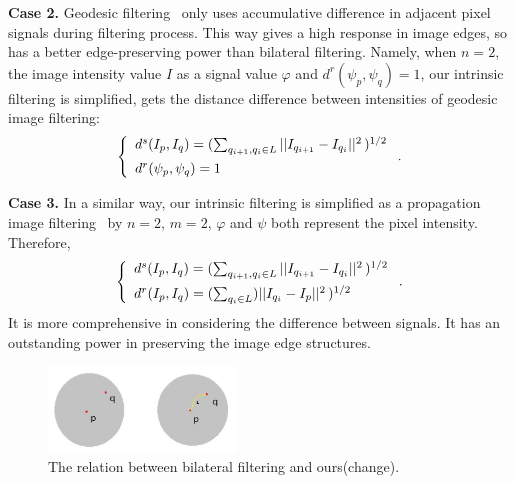 {\bfseries Case 2.}
Geodesic filtering~\cite{grazzini2009edge} only uses accumulative difference in adjacent pixel signals during filtering process.
This way gives a high response in image edges, so has a better edge-preserving power than bilateral filtering.
Namely, when $n=2$, the image intensity value $I$ as a signal value $\varphi$ and $d^{r}(\psi_p, \psi_q) = 1$,
our intrinsic filtering is simplified, gets the distance difference between intensities of geodesic image filtering:
 \begin{equation}
 \label{Eq:GeodesicDistance}
 \left \{
 \begin{array}{ll}
        d^{s}(I_p,I_q) = (\sum_{q_{i+1}, q_i \in{L}}||I_{q_{i+1}} - I_{q_i}||^{2}\,)^{1/2} \vspace{1.5mm} \\
        d^{r}(\psi_p, \psi_q) = 1 \\
 \end{array}
 \right. .
 \end{equation}

{\bfseries Case 3.}
In a similar way, our intrinsic filtering is simplified as a propagation image filtering~\cite{Chang2015propagated} by $n=2$, $m=2$, $\varphi$ and $\psi$ both represent the pixel intensity.
Therefore,
 \begin{equation}
 \label{Eq:PropagationDistance}
 \left \{
 \begin{array}{ll}
        d^{s}(I_p, I_q) = (\sum_{q_{i+1}, q_i \in{L}}||I_{q_{i+1}} - I_{q_i}||^{2}\,)^{1/2} \vspace{1.5mm}\\
        d^{r}(I_p, I_q) = (\sum_{{q_i} \in{L}})||I_{q_i} - I_p||^2\,)^{1/2} \\
 \end{array}
 \right. .
 \end{equation}
It is more comprehensive in considering the difference between signals.
It has an outstanding power in preserving the image edge structures.

\begin{figure}
\centering
\includegraphics[width = 5.0cm]{results/Relation/relation.jpg}
\vspace{0.5mm}
\caption{ The relation between bilateral filtering and ours(change).}
\label{Fig:relation}
\end{figure}

